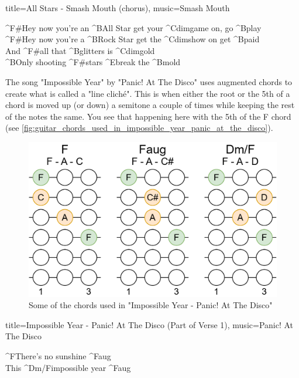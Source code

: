 \begin{song}[verse/numbered, align-chords=l]{title={All Stars - Smash Mouth (chorus)}, music={Smash Mouth}}
	\begin{chorus}
		^{F#}Hey now you're an ^{B}All Star get your ^{Cdim}game on, go ^{B}play \\
		^{F#}Hey now you're a ^{B}Rock Star get the ^{Cdim}show on get ^{B}paid \\
		And ^{F#}all that ^{B}glitters is ^{Cdim}gold \\
	 	^{B}Only shooting ^{F#}stars ^{E}break the ^{B}mold \\
	\end{chorus}
\end{song}



The song "Impossible Year" by "Panic! At The Disco" uses augmented chords to create what is called a "line cliché". This is when either the root or the 5th of a chord is moved up (or down) a semitone a couple of times while keeping the rest of the notes the same. You see that happening here with the 5th of the F chord (see \autoref{fig:guitar_chords_used_in_impossible_year_panic_at_the_disco}).

\begin{figure}[h]
	\centering
	\includegraphics[height=0.16\textheight]{../../Images/ChordsUsedInImpossibleYearPanicAtTheDisco.png}
	\caption{Some of the chords used in "Impossible Year - Panic! At The Disco"}
	\label{fig:guitar_chords_used_in_impossible_year_panic_at_the_disco}
\end{figure}

\begin{song}[verse/numbered, align-chords=l]{title={Impossible Year - Panic! At The Disco (Part of Verse 1)}, music={Panic! At The Disco}}
	\begin{chorus}
		^{F}There's no sunshine ^{Faug} \\
		This ^{Dm/F}impossible year ^{Faug} \\
	\end{chorus}
\end{song}

